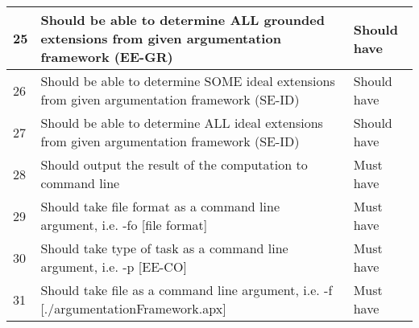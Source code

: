 \begin{center}
\begin{longtable}{| p{} | p{} | p{} |}
25 & Should be able to determine ALL grounded extensions from given argumentation framework (EE-GR)                                                          & Should have \\ \hline
26 & Should be able to determine SOME ideal extensions from given argumentation framework (SE-ID)                                                            & Should have \\ \hline
27 & Should be able to determine ALL ideal extensions from given argumentation framework (SE-ID)                                                             & Should have \\ \hline
28 & Should output the result of the computation to command line                                                                                             & Must have   \\ \hline
29 & Should take file format as a command line argument, i.e. -fo {[}file format{]}                                                                          & Must have   \\ \hline
30 & Should take type of task as a command line argument, i.e. -p {[}EE-CO{]}                                                                                & Must have   \\ \hline
31 & Should take file as a command line argument, i.e. -f {[}./argumentationFramework.apx{]}                                                                 & Must have   \\ \hline 
\end{longtable}
\end{center}